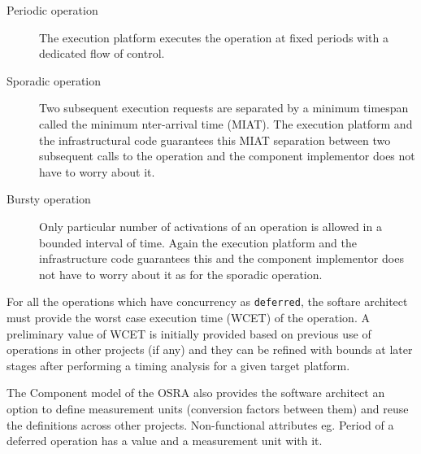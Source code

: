 \begin{description}
\begin{description}
\item [Periodic operation] The execution platform executes the operation at fixed periods with a dedicated flow of control.
\item [Sporadic operation] Two subsequent execution requests are separated by a minimum timespan called the minimum nter-arrival time (MIAT). The execution platform and the infrastructural code  guarantees this MIAT separation between two subsequent calls to the operation and the component implementor does not have to worry about it.
\item [Bursty operation] Only particular number of activations of an operation is allowed in a bounded interval of time. Again the execution platform and the infrastructure code guarantees this and the component implementor does not have to worry about it as for the sporadic operation.
\end{description}

For all the operations which have concurrency as \texttt{deferred}, the softare architect must provide the worst case execution time (WCET) of the operation. A preliminary value of WCET is initially provided based on previous use of operations in other projects (if any) and they can be refined with bounds at later stages after performing a timing analysis for a given target platform.

The Component model of the OSRA also provides the software architect an option to define measurement units (conversion factors between them) and reuse the definitions across other projects. Non-functional attributes eg. Period of a deferred operation has a value and a measurement unit with it.


\end{description}
